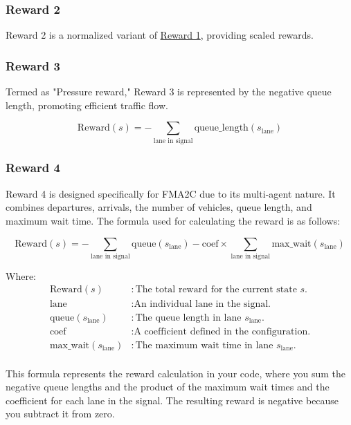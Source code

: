 \subsubsection{Reward 2} \label{subsec:reward-2}
Reward 2 is a normalized variant of \hyperref[subsec:reward-1]{Reward 1}, providing scaled rewards.

\subsubsection{Reward 3} \label{subsec:reward-3}
Termed as "Pressure reward," Reward 3 is represented by the negative queue length, promoting efficient traffic flow.

\begin{equation}
    \text{Reward}(s) = -\sum_{\text{lane in signal}} \text{queue\_length}(s_{\text{lane}})
\end{equation}

\subsubsection{Reward 4} \label{subsec:reward-4}
Reward 4 is designed specifically for FMA2C due to its multi-agent nature. It combines departures, arrivals, the number of vehicles, queue length, and maximum wait time. The formula used for calculating the reward is as follows:

\begin{equation}
    \text{Reward}(s) = -\sum_{\text{lane in signal}} \text{queue}(s_{\text{lane}}) - \text{coef} \times \sum_{\text{lane in signal}} \text{max\_wait}(s_{\text{lane}})
\end{equation}
    
Where:
\begin{align*}
\text{Reward}(s) & : \text{The total reward for the current state } s. \\
\text{lane} & : \text{An individual lane in the signal.} \\
\text{queue}(s_{\text{lane}}) & : \text{The queue length in lane } s_{\text{lane}}. \\
\text{coef} & : \text{A coefficient defined in the configuration.} \\
\text{max\_wait}(s_{\text{lane}}) & : \text{The maximum wait time in lane } s_{\text{lane}}. \\
\end{align*}
    
This formula represents the reward calculation in your code, where you sum the negative queue lengths and the product of the maximum wait times and the coefficient for each lane in the signal. The resulting reward is negative because you subtract it from zero.

